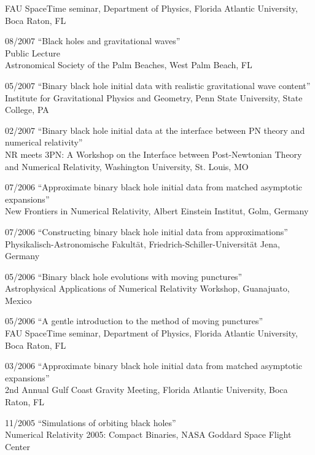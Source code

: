 \documentclass[11pt]{article}
\begin{document}
\begin{list}{}{\leftmargin=5em =1.5em \rightmargin=-8em =7em}
		{FAU SpaceTime seminar, Department of Physics}, 
		{Florida Atlantic University, Boca Raton, FL}
\item[08/2007]	``Black holes and gravitational waves''\\
		{Public Lecture}\\ 
		{Astronomical Society of the Palm Beaches, 
		   West Palm Beach, FL}
\item[05/2007]	``Binary black hole initial data with
		    realistic gravitational wave content''\\
		{Institute for Gravitational
		       Physics and Geometry},
		{Penn State University, State College, PA}
\item[02/2007]	``Binary black hole initial data at the interface between
		    PN theory and numerical relativity''\\
		{NR meets 3PN: A Workshop on the Interface between
                   Post-Newtonian Theory}\\ 
		{and Numerical Relativity},
		{Washington University, St. Louis, MO}
\item[07/2006]	``Approximate binary black hole initial data from
		    matched asymptotic expansions''\\
		{New Frontiers in Numerical Relativity},
		{Albert Einstein Institut, Golm, Germany}
\item[07/2006]	``Constructing binary black hole initial data
		    from approximations''\\
		{Physikalisch-Astronomische Fakult\"at},
		{Friedrich-Schiller-Universit\"at Jena, Germany}
\item[05/2006]	``Binary black hole evolutions with moving punctures''\\
		{Astrophysical Applications of Numerical 
                       Relativity Workshop},
		{Guanajuato, Mexico}
\item[05/2006]	``A gentle introduction to the method of moving punctures''\\
		{FAU SpaceTime seminar, Department of Physics}, 
		{Florida Atlantic University, Boca Raton, FL}
\item[03/2006]	``Approximate binary black hole initial data
		    from matched asymptotic expansions''\\
		{2nd Annual Gulf Coast Gravity Meeting},
		{Florida Atlantic University, Boca Raton, FL}
\item[11/2005]	``Simulations of orbiting black holes''\\
		{Numerical Relativity 2005: Compact Binaries},
		{NASA Goddard Space Flight Center}

\end{list}
\end{document}
